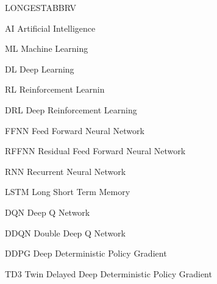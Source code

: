\begin{theglossary}{LONGESTABBRV}
\item[AI] Artificial Intelligence
\item[ML] Machine Learning
\item[DL] Deep Learning
\item[RL] Reinforcement Learnin
\item[DRL] Deep Reinforcement Learning
\item[FFNN] Feed Forward Neural Network
\item[RFFNN] Residual Feed Forward Neural Network
\item[RNN] Recurrent Neural Network
\item[LSTM] Long Short Term Memory
\item[DQN] Deep Q Network
\item[DDQN] Double Deep Q Network
\item[DDPG] Deep Deterministic Policy Gradient
\item[TD3] Twin Delayed Deep Deterministic Policy Gradient
\end{theglossary}
